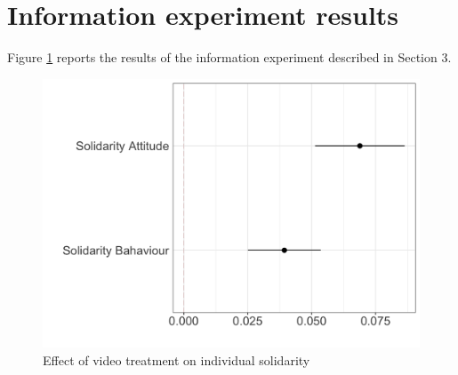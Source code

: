 \documentclass[12pt,oneside]{article}
\begin{document}


\clearpage
\section{Information experiment results}

Figure \ref{fig:video} reports the results of the information experiment described in Section 3.

\begin{figure}[hbt!]
	\includegraphics[width=\linewidth]{2_figures/fig_video.png}
	\caption{Effect of video treatment on individual solidarity}
	\label{fig:video}
\end{figure}
\end{document}
